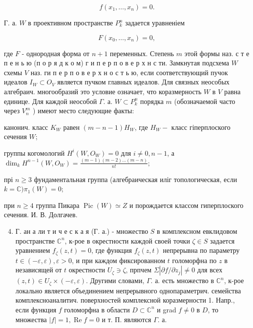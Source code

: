 \documentclass[10pt]{article}
\begin{document}
\[

f\left(x_{1}, \ldots, x_{n}\right)=0 .

\]



Г. а. $W$ в проективном пространстве $P_{k}^{n}$ задается уравненіем



\[

F\left(x_{0}, \ldots, x_{n}\right)=0,

\]



где $F$ - однородная форма от $n+1$ переменных. Степень $m$ этой формы наз. с т е п е н ь ю (п о р я д к о м) г и п е р п о в е р х н с ти. Замкнутая подсхема $W$ схемы $V$ наз. ги п е р п о в е р х н о с т ь ю, если соответствующий пучок идеалов $I_{W} \subset O_{V}$ является пучком главных идеалов. Для связных неособых алгебраич. многообразий это условие означает, что коразмерность $W$ в $V$ равна единице. Для каждой неособой $\Gamma$. а. $W \subset P_{k}^{n}$ порядка $m$ (обозначаемой часто через $V_{n}^{m}$ ) имеют место следующие факты:



канонич. класс $K_{W}$ равен $(m-n-1) H_{W}$, где $H_{W}-$ класс гіперплоского сечения $W$;



группы когомологий $H^{i}\left(W, O_{W}\right)=0$ для $i \neq 0, n-1$, а $\operatorname{dim}_{k} H^{n-1}\left(W, O_{W}\right)=\frac{(m-1)(m-2) \ldots(m-n)}{n !} ;$



прі $n \geqslant 3$ фундаментальная группа (алгебраическая иліг топологическая, если $k=\mathbb{C}) \pi_{1}(W)=0$;



при $n \geqslant 4$ группа Пикара $\operatorname{Pic}(W) \simeq Z$ и порождается классом гиперплоского сечения. И. В. Долгачев.



\begin{enumerate}

  \setcounter{enumi}{3}

  \item Г. ан а ли т и ч е с к а я (Г. а.) - множество $S$ в комплексном евклидовом пространстве $\mathbb{C}^{n}$, к-рое в окрестности каждой своей точки $\zeta \in S$ задается уравнением $f_{\zeta}(z, t)=0$, где функция $f_{\zeta}(z, t)$ непрерывна по параметру $t \in(-\varepsilon, \varepsilon), \varepsilon>0$, и при каждом фиксированном $t$ голоморфна по $z$ в независящей от $t$ окрестности $U_{\zeta} \ni \zeta$, прпчем $\Sigma\left|\partial f / \partial z_{j}\right| \neq 0$ для всех $(z, t) \in U_{\zeta} \times(-\varepsilon, \varepsilon)$. Другими словами, $\Gamma$. а. есть множество в $\mathbb{C}^{n}$, к-рое локально является объединением непрерывного однопараметрич. семейства комплексноаналитич. поверхностей комплексной коразмерности 1. Напр., если функция $f$ голоморфна в области $D \subset \mathbb{C}^{n}$ и grad $f \neq 0$ в $D$, то множества $|f|=1, \operatorname{Re} f=0$ и т. П. являются $\Gamma$. а.

\end{enumerate}
\end{document}
